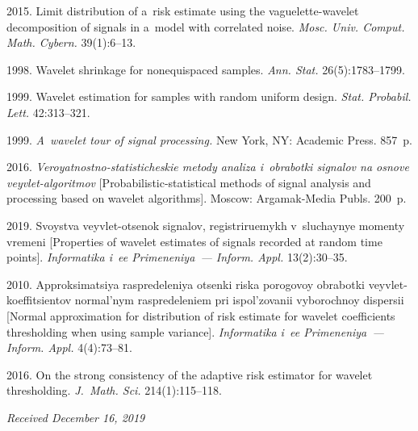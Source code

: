 \begin{multicols}{2}
{{\begin{thebibliography}{99}
 2015. Limit distribution of a~risk estimate using the vaguelette-wavelet decomposition of signals in 
 a~model with correlated noise.  \textit{Mosc. Univ. Comput. Math. Cybern.} 39(1):6--13.

 1998. Wavelet shrinkage for nonequispaced samples. 
 \textit{Ann. Stat.} 26(5):1783--1799.

 1999. Wavelet estimation for samples with random uniform design. 
 \textit{Stat. Probabil. Lett.} 42:313--321.

 1999.  \textit{A~wavelet tour of signal processing.} New York, NY: Academic Press. 857~p.

 2016.  \textit{Veroyatnostno-statisticheskie 
metody analiza 
i~obrabotki signalov na osnove veyvlet-algoritmov} [Probabilistic-statistical methods 
of signal analysis and processing based on wavelet algorithms]. Moscow: 
Argamak-Media Publs. 200~p.

 2019. Svoystva veyvlet-otsenok signalov,
 registriruemykh 
v~sluchaynye momenty vremeni [Properties of wavelet estimates of signals recorded at random time points]. 
 \textit{Informatika i~ee Primeneniya~--- Inform. Appl.} 13(2):30--35.

 2010. Approksimatsiya raspredeleniya otsen\-ki riska porogovoy obrabotki 
veyvlet-koeffitsientov normal'nym raspredeleniem pri ispol'zovanii vyborochnoy dispersii 
[Normal approximation for distribution of risk estimate for wavelet coefficients thresholding 
when using sample variance].  \textit{Informatika i~ee Primeneniya~--- Inform. Appl.} 4(4):73--81.

 2016. On the strong consistency of the adaptive risk estimator for wavelet thresholding.
 \textit{J.~Math. Sci.} 214(1):115--118.
 \end{thebibliography}

 }
 }

\end{multicols}


\hfill{\small\textit{Received December 16, 2019}}


